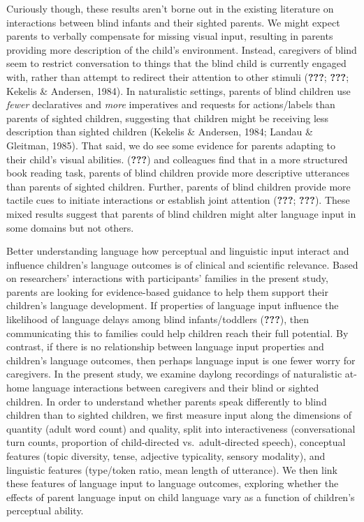 \documentclass[english,man]{apa6}
\begin{document}
Curiously though, these results aren't borne out in the existing literature on interactions between blind infants and their sighted parents. We might expect parents to verbally compensate for missing visual input, resulting in parents providing more description of the child's environment. Instead, caregivers of blind seem to restrict conversation to things that the blind child is currently engaged with, rather than attempt to redirect their attention to other stimuli ({\textbf{???}}; {\textbf{???}}; Kekelis \& Andersen, 1984). In naturalistic settings, parents of blind children use \emph{fewer} declaratives and \emph{more} imperatives and requests for actions/labels than parents of sighted children, suggesting that children might be receiving less description than sighted children (Kekelis \& Andersen, 1984; Landau \& Gleitman, 1985). That said, we do see some evidence for parents adapting to their child's visual abilities. ({\textbf{???}}) and colleagues find that in a more structured book reading task, parents of blind children provide more descriptive utterances than parents of sighted children. Further, parents of blind children provide more tactile cues to initiate interactions or establish joint attention ({\textbf{???}}; {\textbf{???}}). These mixed results suggest that parents of blind children might alter language input in some domains but not others.

Better understanding language how perceptual and linguistic input interact and influence children's language outcomes is of clinical and scientific relevance. Based on researchers' interactions with participants' families in the present study, parents are looking for evidence-based guidance to help them support their children's language development. If properties of language input influence the likelihood of language delays among blind infants/toddlers ({\textbf{???}}), then communicating this to families could help children reach their full potential. By contrast, if there is no relationship between language input properties and children's language outcomes, then perhaps language input is one fewer worry for caregivers. In the present study, we examine daylong recordings of naturalistic at-home language interactions between caregivers and their blind or sighted children. In order to understand whether parents speak differently to blind children than to sighted children, we first measure input along the dimensions of quantity (adult word count) and quality, split into interactiveness (conversational turn counts, proportion of child-directed vs.~adult-directed speech), conceptual features (topic diversity, tense, adjective typicality, sensory modality), and linguistic features (type/token ratio, mean length of utterance). We then link these features of language input to language outcomes, exploring whether the effects of parent language input on child language vary as a function of children's perceptual ability.
\end{document}
